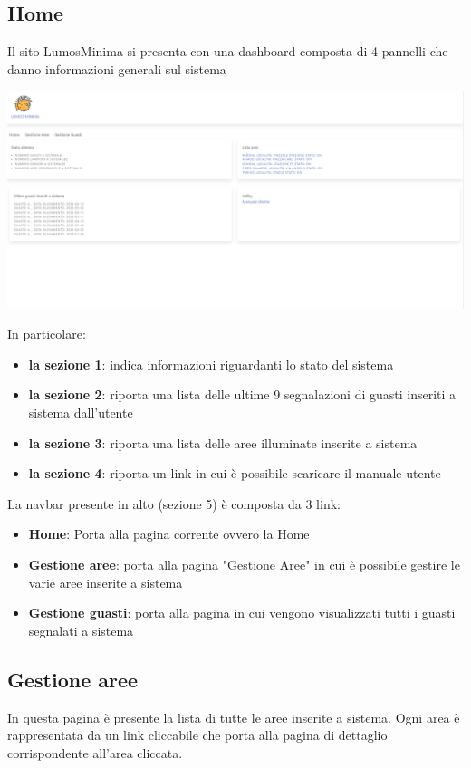 \documentclass[9pt]{article}
\begin{document}
\subsection{Home}
Il sito LumosMinima si presenta con una dashboard composta di 4 pannelli che danno informazioni generali 
sul sistema

\begin{center}
	\includegraphics[scale=0.3]{LumosMinimaHome.png}
\end{center}

In particolare:
\begin{itemize}
	\item \textbf{la sezione 1}: indica informazioni riguardanti lo stato del sistema
	\item \textbf{la sezione 2}: riporta una lista delle ultime 9 segnalazioni di guasti inseriti a sistema dall'utente
	\item \textbf{la sezione 3}: riporta una lista delle aree illuminate inserite a sistema
	\item \textbf{la sezione 4}: riporta un link in cui è possibile scaricare il manuale utente\\
\end{itemize}

La navbar presente in alto (sezione 5) è composta da 3 link:

\begin{itemize}
\item \textbf{Home}: Porta alla pagina corrente ovvero la Home
\item \textbf{Gestione aree}: porta alla pagina "Gestione Aree" in cui è possibile gestire le varie aree inserite a sistema
\item \textbf{Gestione guasti}: porta alla pagina in cui vengono visualizzati tutti i guasti segnalati a sistema
\end{itemize}

\subsection{Gestione aree}
In questa pagina è presente la lista di tutte le aree inserite a sistema. 
Ogni area è rappresentata da un link cliccabile che porta alla pagina di dettaglio corrispondente all'area cliccata.
\end{document}
